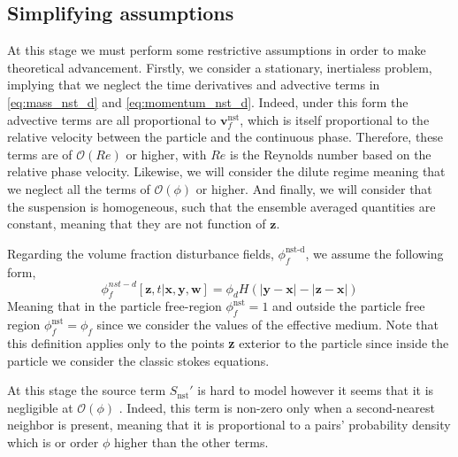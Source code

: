 \subsection{Simplifying assumptions}

At this stage we must perform some restrictive assumptions in order to make theoretical advancement. 
Firstly, we consider a stationary, inertialess problem, implying that we neglect the time derivatives and advective terms in \ref{eq:mass_nst_d} and \ref{eq:momentum_nst_d}. 
Indeed, under this form the advective terms are all proportional to $\textbf{v}_f^\text{nst}$, which is itself proportional to the relative velocity between the particle and the continuous phase. 
Therefore, these terms are of $\mathcal{O}(Re)$ or higher, with $Re$ is the Reynolds number based on the relative phase velocity. 
Likewise, we will consider the dilute regime meaning that we neglect all the terms of $\mathcal{O}(\phi)$ or higher. 
And finally, we will consider that the suspension is homogeneous, such that the ensemble averaged quantities are constant, meaning that they are not function of $\textbf{z}$. 


Regarding the volume fraction disturbance fields, $\phi_f^\text{nst-d}$, we assume the following form, 
\begin{equation*}
    \phi_f^{nst-d}[\textbf{z},t|\textbf{x},\textbf{y},\textbf{w}]
    = \phi_d H(|\textbf{y} - \textbf{x}| - |\textbf{z} - \textbf{x}|)
\end{equation*}
Meaning that in the particle free-region $\phi_f^\text{nst} = 1$ and outside the particle free region $\phi_f^\text{nst} = \phi_f$ since we consider the values of the effective medium. 
Note that this definition applies only to the points \textbf{z} exterior to the particle since inside the particle we consider the classic stokes equations. 

At this stage the source term $S_\text{nst}'$ is hard to model however it seems that it is negligible at $\mathcal{O}(\phi)$ \citet{zhang2021ensemble}. 
Indeed, this term is non-zero only when a second-nearest neighbor is present, meaning that it is proportional to a pairs' probability density which is or order $\phi$ higher than the other terms. 

